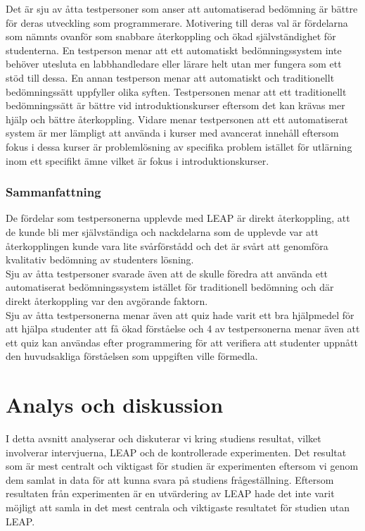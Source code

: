 \documentclass[a4paper,11pt]{article}
\begin{document}
{Det är sju av åtta testpersoner som anser att automatiserad bedömning är bättre för deras utveckling som programmerare. Motivering till deras val är fördelarna som nämnts ovanför som snabbare återkoppling och ökad självständighet för studenterna. En testperson menar att ett automatiskt bedömningssystem inte behöver utesluta en labbhandledare eller lärare helt utan mer fungera som ett stöd till dessa. En annan testperson menar att automatiskt och traditionellt bedömningssätt uppfyller olika syften. Testpersonen menar att ett traditionellt bedömningssätt är bättre vid introduktionskurser eftersom det kan krävas mer hjälp och bättre återkoppling. Vidare menar testpersonen att ett automatiserat system är mer lämpligt att använda i kurser med avancerat innehåll eftersom fokus i dessa kurser är problemlösning av specifika problem istället för utlärning inom ett specifikt ämne vilket är fokus i introduktionskurser.

\newpage
\subsubsection{Sammanfattning}

De fördelar som testpersonerna upplevde med LEAP är direkt återkoppling, att de kunde bli mer självständiga och nackdelarna som de upplevde var att återkopplingen kunde vara lite svårförstådd och det är svårt att genomföra kvalitativ bedömning av studenters lösning.
\\
Sju av åtta testpersoner svarade även att de skulle föredra att använda ett automatiserat bedömningssystem istället för traditionell bedömning och där direkt återkoppling var den avgörande faktorn.
\\
Sju av åtta testpersonerna menar även att quiz hade varit ett bra hjälpmedel för att hjälpa studenter att få ökad förståelse och 4 av testpersonerna menar även att ett quiz kan användas efter programmering för att verifiera att studenter uppnått den huvudsakliga förståelsen som uppgiften ville förmedla.

\newpage
\section{Analys och diskussion}\label{diskussion}

I detta avsnitt analyserar och diskuterar vi kring studiens resultat, vilket involverar intervjuerna, LEAP och de kontrollerade experimenten. Det resultat som är mest centralt och viktigast för studien är experimenten eftersom vi genom dem samlat in data för att kunna svara på studiens frågeställning. Eftersom resultaten från experimenten är en utvärdering av LEAP hade det inte varit möjligt att samla in det mest centrala och viktigaste resultatet för studien utan LEAP.

}
\end{document}
